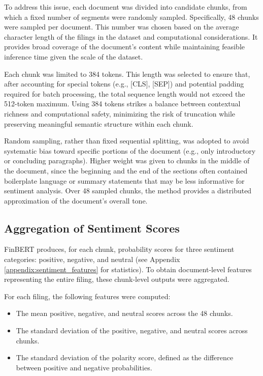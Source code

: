 To address this issue, each document was divided into candidate chunks, from which a fixed number of segments were randomly sampled. 
Specifically, 48 chunks were sampled per document. 
This number was chosen based on the average character length of the filings in the dataset and computational considerations. 
It provides broad coverage of the document's content while maintaining feasible inference time given the scale of the dataset.

Each chunk was limited to 384 tokens. 
This length was selected to ensure that, after accounting for special tokens (e.g., [CLS], [SEP]) and potential padding required for batch processing, the total sequence length would not exceed the 512-token maximum. 
Using 384 tokens strikes a balance between contextual richness and computational safety, minimizing the risk of truncation while preserving meaningful semantic structure within each chunk.

Random sampling, rather than fixed sequential splitting, was adopted to avoid systematic bias toward specific portions of the document (e.g., only introductory or concluding paragraphs). 
Higher weight was given to chunks in the middle of the document, since the beginning and the end of the sections often contained boilerplate language or summary statements 
that may be less informative for sentiment analysis.
Over 48 sampled chunks, the method provides a distributed approximation of the document's overall tone.

\subsection*{Aggregation of Sentiment Scores}

FinBERT produces, for each chunk, probability scores for three sentiment categories: positive, negative, and neutral (see Appendix \ref{appendix:sentiment_features} for statistics). 
To obtain document-level features representing the entire filing, these chunk-level outputs were aggregated.

For each filing, the following features were computed:
\begin{itemize}
    \item The mean positive, negative, and neutral scores across the 48 chunks.
	\item The standard deviation of the positive, negative, and neutral scores across chunks.
    \item The standard deviation of the polarity score, defined as the difference between positive and negative probabilities.
\end{itemize}

